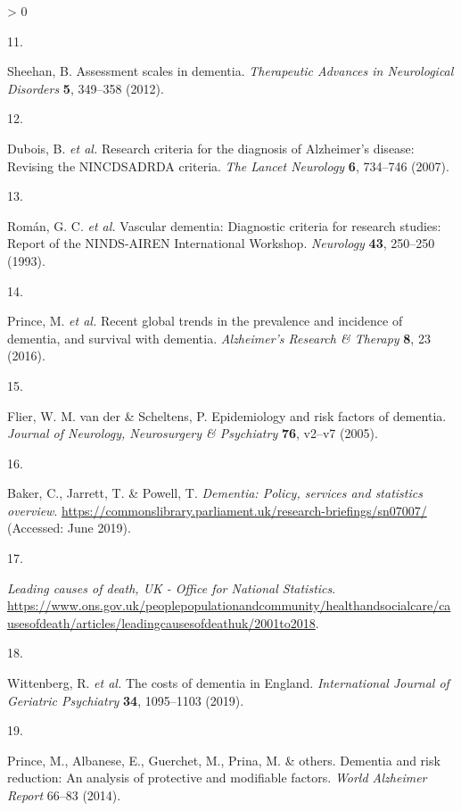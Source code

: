 \documentclass[a4paper, twoside]{templates/ociamthesis}
\newlength{\cslhangindent}
\newlength{\csllabelwidth}
\newenvironment{CSLReferences}[3] %
 {%
  \setlength{\parindent}{0pt}
  \ifodd #1 \everypar{\setlength{\hangindent}{\cslhangindent}}\ignorespaces\fi
  \ifnum #2 > 0
  \setlength{\parskip}{#2\baselineskip}
  \fi
 }%
 {}
\newcommand{\CSLLeftMargin}[1]{\parbox[t]{\maxof{\widthof{#1}}{\csllabelwidth}}{#1}}
\newcommand{\CSLRightInline}[1]{\parbox[t]{\linewidth - \csllabelwidth}{#1}}
\begin{document}
\begin{CSLReferences}{0}{0}
\leavevmode\hypertarget{ref-sheehan2012}{}%
\CSLLeftMargin{11. }
\CSLRightInline{Sheehan, B. Assessment scales in dementia. \emph{Therapeutic Advances in Neurological Disorders} \textbf{5}, 349--358 (2012).}

\leavevmode\hypertarget{ref-dubois2007}{}%
\CSLLeftMargin{12. }
\CSLRightInline{Dubois, B. \emph{et al.} Research criteria for the diagnosis of {Alzheimer}'s disease: Revising the {NINCDS}{{ADRDA}} criteria. \emph{The Lancet Neurology} \textbf{6}, 734--746 (2007).}

\leavevmode\hypertarget{ref-roman1993}{}%
\CSLLeftMargin{13. }
\CSLRightInline{Román, G. C. \emph{et al.} Vascular dementia: Diagnostic criteria for research studies: Report of the {NINDS}-{AIREN International Workshop}. \emph{Neurology} \textbf{43}, 250--250 (1993).}

\leavevmode\hypertarget{ref-prince2016}{}%
\CSLLeftMargin{14. }
\CSLRightInline{Prince, M. \emph{et al.} Recent global trends in the prevalence and incidence of dementia, and survival with dementia. \emph{Alzheimer's Research \& Therapy} \textbf{8}, 23 (2016).}

\leavevmode\hypertarget{ref-flier2005}{}%
\CSLLeftMargin{15. }
\CSLRightInline{Flier, W. M. van der \& Scheltens, P. Epidemiology and risk factors of dementia. \emph{Journal of Neurology, Neurosurgery \& Psychiatry} \textbf{76}, v2--v7 (2005).}

\leavevmode\hypertarget{ref-baker2019}{}%
\CSLLeftMargin{16. }
\CSLRightInline{Baker, C., Jarrett, T. \& Powell, T. \emph{Dementia: Policy, services and statistics overview}. \url{https://commonslibrary.parliament.uk/research-briefings/sn07007/} (Accessed: June 2019).}

\leavevmode\hypertarget{ref-zotero-15757}{}%
\CSLLeftMargin{17. }
\CSLRightInline{\emph{Leading causes of death, {UK} - {Office} for {National Statistics}}. \url{https://www.ons.gov.uk/peoplepopulationandcommunity/healthandsocialcare/causesofdeath/articles/leadingcausesofdeathuk/2001to2018}.}

\leavevmode\hypertarget{ref-wittenberg2019}{}%
\CSLLeftMargin{18. }
\CSLRightInline{Wittenberg, R. \emph{et al.} The costs of dementia in {England}. \emph{International Journal of Geriatric Psychiatry} \textbf{34}, 1095--1103 (2019).}

\leavevmode\hypertarget{ref-prince2014}{}%
\CSLLeftMargin{19. }
\CSLRightInline{Prince, M., Albanese, E., Guerchet, M., Prina, M. \& others. Dementia and risk reduction: An analysis of protective and modifiable factors. \emph{World Alzheimer Report} 66--83 (2014).}


\end{CSLReferences}
\end{document}
